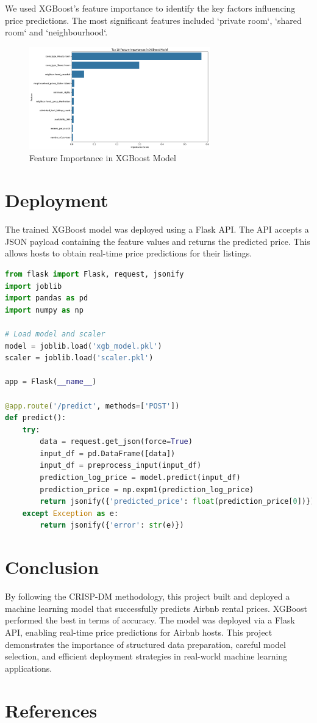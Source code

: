 \documentclass{article}
\begin{document}
We used XGBoost's feature importance to identify the key factors influencing price predictions. The most significant features included `private room`, `shared room` and `neighbourhood`.

\begin{figure}[h!]
    \centering
    \includegraphics[width=0.7\textwidth]{feature_importance.png}
    \caption{Feature Importance in XGBoost Model}
\end{figure}

\section{Deployment}
The trained XGBoost model was deployed using a Flask API. The API accepts a JSON payload containing the feature values and returns the predicted price. This allows hosts to obtain real-time price predictions for their listings.

\begin{lstlisting}[language=Python]
from flask import Flask, request, jsonify
import joblib
import pandas as pd
import numpy as np

# Load model and scaler
model = joblib.load('xgb_model.pkl')
scaler = joblib.load('scaler.pkl')

app = Flask(__name__)

@app.route('/predict', methods=['POST'])
def predict():
    try:
        data = request.get_json(force=True)
        input_df = pd.DataFrame([data])
        input_df = preprocess_input(input_df)
        prediction_log_price = model.predict(input_df)
        prediction_price = np.expm1(prediction_log_price)
        return jsonify({'predicted_price': float(prediction_price[0])})
    except Exception as e:
        return jsonify({'error': str(e)})
\end{lstlisting}

\section{Conclusion}
By following the CRISP-DM methodology, this project built and deployed a machine learning model that successfully predicts Airbnb rental prices. XGBoost performed the best in terms of accuracy. The model was deployed via a Flask API, enabling real-time price predictions for Airbnb hosts. This project demonstrates the importance of structured data preparation, careful model selection, and efficient deployment strategies in real-world machine learning applications.

\section{References}
\nocite{*}
\printbibliography
\end{document}
